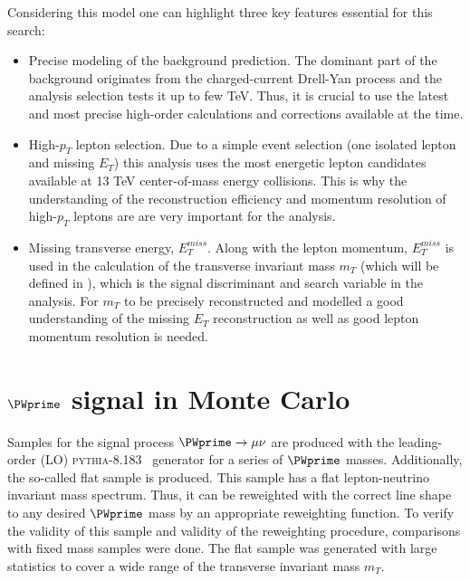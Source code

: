 Considering this model one can highlight three key features essential for this search:
\begin{itemize}
 \item Precise modeling of the background prediction. 
 The dominant part of the background originates from the charged-current Drell-Yan process and the analysis selection tests it up to few TeV.
 Thus, it is crucial to use the latest and most precise high-order calculations and corrections available at the time.
 \item High-$p_T$ lepton selection. Due to a simple event selection (one isolated lepton and missing $E_T$) 
 this analysis uses the most energetic lepton candidates available at 13 TeV center-of-mass energy collisions.
 This is why the understanding of the reconstruction efficiency and momentum resolution of high-$p_T$ leptons are are very important for the analysis.
 \item Missing transverse energy, $E_T^{miss}$. Along with the lepton momentum, $E_T^{miss}$ is used in the calculation of the transverse invariant mass $m_T$ (which will be defined in ),
 which is the signal discriminant and search variable in the analysis. For $m_T$ to be precisely reconstructed and modelled a good understanding of the missing $E_T$ reconstruction as well as good lepton momentum resolution is needed.
\end{itemize}

\section{$\PWprime$ signal in Monte Carlo}
\label{sec:wprimeSignal} 

% 

Samples for the signal process $\PWprime \to \mu \nu$ are produced with the leading-order (LO) 
{\scshape pythia-8.183}~\cite{pythia8} generator for a series of $\PWprime$ masses. 
Additionally, the so-called flat sample is produced. This sample has a flat lepton-neutrino invariant mass spectrum.
Thus, it can be reweighted with the correct line shape to any desired $\PWprime$ mass by an appropriate reweighting function.
To verify the validity of this sample and validity of the reweighting procedure, comparisons with fixed mass samples were done.
The flat sample was generated with large statistics to cover
a wide range of the transverse invariant mass $m_T$.

